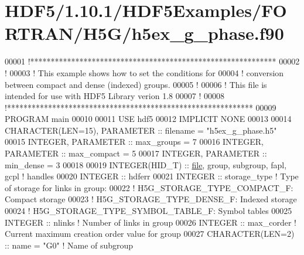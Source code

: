 \hypertarget{_h_d_f5_21_810_81_2_h_d_f5_examples_2_f_o_r_t_r_a_n_2_h5_g_2h5ex__g__phase_8f90_source}{}\section{H\+D\+F5/1.10.1/\+H\+D\+F5\+Examples/\+F\+O\+R\+T\+R\+A\+N/\+H5\+G/h5ex\+\_\+g\+\_\+phase.f90}
\label{_h_d_f5_21_810_81_2_h_d_f5_examples_2_f_o_r_t_r_a_n_2_h5_g_2h5ex__g__phase_8f90_source}

\begin{DoxyCode}
00001 \textcolor{comment}{!************************************************************}
00002 \textcolor{comment}{!}
00003 \textcolor{comment}{!  This example shows how to set the conditions for}
00004 \textcolor{comment}{!  conversion between compact and dense (indexed) groups.}
00005 \textcolor{comment}{!}
00006 \textcolor{comment}{!  This file is intended for use with HDF5 Library verion 1.8}
00007 \textcolor{comment}{!}
00008 \textcolor{comment}{!************************************************************}
00009 \textcolor{keyword}{PROGRAM} main
00010 
00011   \textcolor{keywordtype}{USE }hdf5
00012   \textcolor{keywordtype}{IMPLICIT NONE}
00013 
00014   \textcolor{keywordtype}{CHARACTER(LEN=15)}, \textcolor{keywordtype}{PARAMETER} :: filename  = \textcolor{stringliteral}{"h5ex\_g\_phase.h5"}
00015   \textcolor{keywordtype}{INTEGER}, \textcolor{keywordtype}{PARAMETER} :: max\_groups  = 7
00016   \textcolor{keywordtype}{INTEGER}, \textcolor{keywordtype}{PARAMETER} :: max\_compact = 5
00017   \textcolor{keywordtype}{INTEGER}, \textcolor{keywordtype}{PARAMETER} :: min\_dense   = 3
00018 
00019   \textcolor{keywordtype}{INTEGER(HID\_T)}   :: \hyperlink{structfile}{file}, group, subgroup, fapl, gcpl \textcolor{comment}{! handles}
00020   \textcolor{keywordtype}{INTEGER} :: hdferr
00021   \textcolor{keywordtype}{INTEGER} :: storage\_type \textcolor{comment}{! Type of storage for links in group:}
00022                           \textcolor{comment}{!   H5G\_STORAGE\_TYPE\_COMPACT\_F: Compact storage}
00023                           \textcolor{comment}{!   H5G\_STORAGE\_TYPE\_DENSE\_F: Indexed storage}
00024                           \textcolor{comment}{!   H5G\_STORAGE\_TYPE\_SYMBOL\_TABLE\_F: Symbol tables}
00025   \textcolor{keywordtype}{INTEGER} :: nlinks       \textcolor{comment}{! Number of links in group}
00026   \textcolor{keywordtype}{INTEGER} :: max\_corder   \textcolor{comment}{! Current maximum creation order value for group}
00027   \textcolor{keywordtype}{CHARACTER(LEN=2)} :: name = \textcolor{stringliteral}{"G0"} \textcolor{comment}{! Name of subgroup}

\end{DoxyCode}
